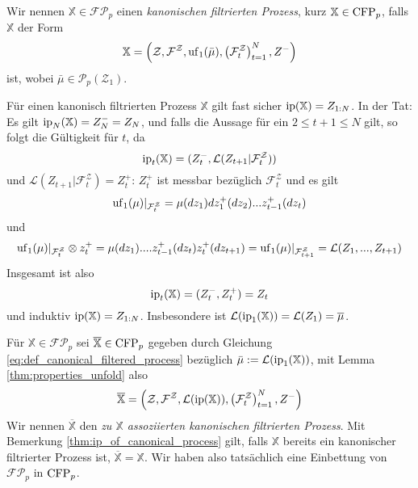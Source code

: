 \begin{definition}
    Wir nennen $\mathbb{X} \in \mathcal{FP}_p$ einen \emph{kanonischen filtrierten Prozess}, kurz $\mathbb{X} \in \operatorname{CFP}_p$, falls $\mathbb{X}$ der Form
    \begin{equation}\label{eq:def_canonical_filtered_process}
    \mathbb{X} = \left( \mathcal{Z}, \mathcal{F}^\mathcal{Z}, \operatorname{uf}_1(\bar{\mu}), \left(\mathcal{F}_t^\mathcal{Z}\right)_{t=1}^N, Z^-\right)
    \end{equation}
    ist, wobei $\bar{\mu} \in \mathcal{P}_p(\mathcal{Z}_1)$.
\end{definition}
\begin{remark}\label{thm:ip_of_canonical_process}
    Für einen kanonisch filtrierten Prozess $\mathbb{X}$ gilt fast sicher $\operatorname{ip}(\mathbb{X}) = Z_{1:N}$. In der Tat: Es gilt $\operatorname{ip}_N(\mathbb{X}) = Z_N^- = Z_N$, und falls die Aussage für ein $2\leq t+1 \leq N$ gilt, so folgt die Gültigkeit für $t$, da 
    $$\operatorname{ip}_t(\mathbb{X}) = (Z_t^-, \mathcal{L}(Z_{t+1} \vert \mathcal{F}_t^\mathcal{Z}))$$
    und $\mathcal{L}(Z_{t+1} \vert \mathcal{F}_t^\mathcal{Z}) = Z_t^+$: $Z_t^+$ ist messbar bezüglich $\mathcal{F}_t^\mathcal{Z}$ und es gilt 
    $$\operatorname{uf}_1(\mu) \vert_{\mathcal{F}_t^\mathcal{Z}} = \mu(dz_1)dz_1^+(dz_2)...z_{t-1}^+(dz_t)$$
    und 
    $$\operatorname{uf}_1(\mu) \vert_{\mathcal{F}_t^\mathcal{Z}} \otimes z_t^+ = \mu(dz_1)....z_{t-1}^+(dz_t)z_t^+(dz_{t+1}) = \operatorname{uf}_1(\mu)\vert_{\mathcal{F}_{t+1}^\mathcal{Z}} = \mathcal{L}(Z_1,...,Z_{t+1})$$
    Insgesamt ist also 
    $$\operatorname{ip}_t(\mathbb{X}) = (Z_t^-, Z_t^+) = Z_t$$
    und induktiv $\operatorname{ip}(\mathbb{X}) = Z_{1:N}$.
    Insbesondere ist $\mathcal{L}(\operatorname{ip}_1(\mathbb{X})) = \mathcal{L}(Z_1) = \overline{\mu}$.
\end{remark}
\begin{definition}
    Für $\mathbb{X} \in \mathcal{FP}_p$ sei $\overline{\mathbb{X}} \in \operatorname{CFP}_p$ gegeben durch Gleichung \ref{eq:def_canonical_filtered_process} bezüglich $\bar\mu := \mathcal{L}(\operatorname{ip}_1(\mathbb{X}))$, mit Lemma \ref{thm:properties_unfold} also
    \begin{equation}\label{eq:associated_process}
        \overline{\mathbb{X}} = \left( \mathcal{Z}, \mathcal{F}^\mathcal{Z}, \mathcal{L}(\operatorname{ip}(\mathbb{X})), \left(\mathcal{F}_t^\mathcal{Z}\right)_{t=1}^N, Z^-\right)
    \end{equation}
    Wir nennen $\overline{\mathbb{X}}$ den \emph{zu $\mathbb{X}$ assoziierten kanonischen filtrierten Prozess}. Mit Bemerkung \ref{thm:ip_of_canonical_process} gilt, falls $\mathbb{X}$ bereits ein kanonischer filtrierter Prozess ist, $\overline{\mathbb{X}} = \mathbb{X}$. Wir haben also tatsächlich eine Einbettung von $\mathcal{FP}_p$ in $\operatorname{CFP}_p$.
\end{definition}
